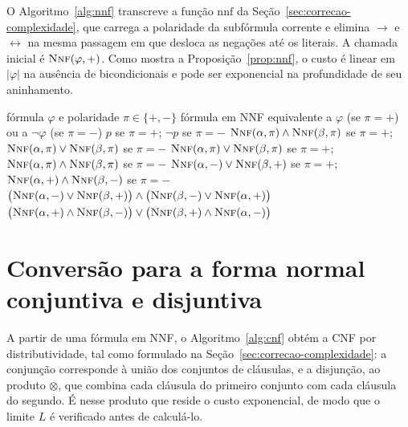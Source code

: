 \documentclass[12pt,a4paper,oneside]{report}
\theoremstyle{tituloplain}
\theoremstyle{titulodef}
\begin{document}
O Algoritmo~\ref{alg:nnf} transcreve a função $\mathrm{nnf}$ da Seção~\ref{sec:correcao-complexidade}, que carrega a polaridade da subfórmula corrente e elimina $\rightarrow$ e $\leftrightarrow$ na mesma passagem em que desloca as negações até os literais. A chamada inicial é $\textsc{Nnf}(\varphi,+)$. Como mostra a Proposição~\ref{prop:nnf}, o custo é linear em $|\varphi|$ na ausência de bicondicionais e pode ser exponencial na profundidade de seu aninhamento.

\begin{algorithm}[htbp]
\caption{Conversão para NNF com polaridade}\label{alg:nnf}
\begin{algorithmic}[1]
\Require fórmula $\varphi$ e polaridade $\pi\in\{+,-\}$
\Ensure fórmula em NNF equivalente a $\varphi$ (se $\pi=+$) ou a $\neg\varphi$ (se $\pi=-$)
    \State \Return $p$ se $\pi=+$; $\neg p$ se $\pi=-$
  \ElsIf{$\varphi=\neg\alpha$}
    \State \Return {}
  \ElsIf{$\varphi=\alpha\wedge\beta$}
    \State \Return $\textsc{Nnf}(\alpha,\pi)\wedge\textsc{Nnf}(\beta,\pi)$ se $\pi=+$; $\textsc{Nnf}(\alpha,\pi)\vee\textsc{Nnf}(\beta,\pi)$ se $\pi=-$
  \ElsIf{$\varphi=\alpha\vee\beta$}
    \State \Return $\textsc{Nnf}(\alpha,\pi)\vee\textsc{Nnf}(\beta,\pi)$ se $\pi=+$; $\textsc{Nnf}(\alpha,\pi)\wedge\textsc{Nnf}(\beta,\pi)$ se $\pi=-$
  \ElsIf{$\varphi=\alpha\rightarrow\beta$}
    \State \Return $\textsc{Nnf}(\alpha,-)\vee\textsc{Nnf}(\beta,+)$ se $\pi=+$; $\textsc{Nnf}(\alpha,+)\wedge\textsc{Nnf}(\beta,-)$ se $\pi=-$
  \ElsIf{$\varphi=\alpha\leftrightarrow\beta$}
    \If{$\pi=+$}
      \State \Return $\bigl(\textsc{Nnf}(\alpha,-)\vee\textsc{Nnf}(\beta,+)\bigr)\wedge\bigl(\textsc{Nnf}(\beta,-)\vee\textsc{Nnf}(\alpha,+)\bigr)$
    \Else
      \State \Return $\bigl(\textsc{Nnf}(\alpha,+)\wedge\textsc{Nnf}(\beta,-)\bigr)\vee\bigl(\textsc{Nnf}(\beta,+)\wedge\textsc{Nnf}(\alpha,-)\bigr)$
    \EndIf
  \EndIf
\EndFunction
\end{algorithmic}
\end{algorithm}

\section{Conversão para a forma normal conjuntiva e disjuntiva}

A partir de uma fórmula em NNF, o Algoritmo~\ref{alg:cnf} obtém a CNF por distributividade, tal como formulado na Seção~\ref{sec:correcao-complexidade}: a conjunção corresponde à união dos conjuntos de cláusulas, e a disjunção, ao produto $\otimes$, que combina cada cláusula do primeiro conjunto com cada cláusula do segundo. É nesse produto que reside o custo exponencial, de modo que o limite $L$ é verificado antes de calculá-lo.
\end{document}
